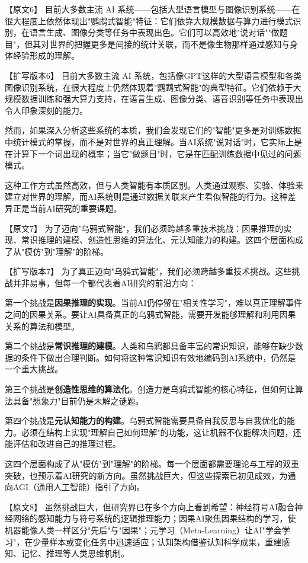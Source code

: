 【原文6】
目前大多数主流 AI 系统——包括大型语言模型与图像识别系统——在很大程度上依然体现出"鹦鹉式智能"特征：它们依靠大规模数据与算力进行模式识别，在语言生成、图像分类等任务中表现出色。它们可以高效地"说对话""做题目"，但其对世界的把握更多是间接的统计关联，而不是像生物那样通过感知与身体经验形成的理解。

【扩写版本6】
目前大多数主流 AI 系统，包括像GPT这样的大型语言模型和各类图像识别系统，在很大程度上仍然体现着"鹦鹉式智能"的典型特征。它们依赖于大规模数据训练和强大算力支持，在语言生成、图像分类、语音识别等任务中表现出令人印象深刻的能力。

然而，如果深入分析这些系统的本质，我们会发现它们的"智能"更多是对训练数据中统计模式的掌握，而不是对世界的真正理解。当AI系统"说对话"时，它实际上是在计算下一个词出现的概率；当它"做题目"时，它是在匹配训练数据中见过的问题模式。

这种工作方式虽然高效，但与人类智能有本质区别。人类通过观察、实验、体验来建立对世界的理解，而AI系统则是通过数据关联来产生看似智能的行为。这种差异正是当前AI研究的重要课题。

【原文7】
为了迈向"乌鸦式智能"，我们必须跨越多重技术挑战：因果推理的实现、常识推理的建模、创造性思维的算法化、元认知能力的构建。这四个层面构成了从"模仿"到"理解"的阶梯。

【扩写版本7】
为了真正迈向"乌鸦式智能"，我们必须跨越多重技术挑战。这些挑战并非易事，但每一个都代表着AI研究的前沿方向：

第一个挑战是\textbf{因果推理的实现}。当前AI仍停留在"相关性学习"，难以真正理解事件之间的因果关系。要让AI具备真正的乌鸦式智能，需要开发能够理解和利用因果关系的算法和模型。

第二个挑战是\textbf{常识推理的建模}。人类和乌鸦都具备丰富的常识知识，能够在缺少数据的条件下做出合理判断。如何将这种常识知识有效地编码到AI系统中，仍然是一个重大挑战。

第三个挑战是\textbf{创造性思维的算法化}。创造力是乌鸦式智能的核心特征，但如何让算法具备"想象力"目前仍是未解之谜题。

第四个挑战是\textbf{元认知能力的构建}。乌鸦式智能需要具备自我反思与自我优化的能力。必须在结构上实现"理解自己如何理解"的功能，这让机器不仅能解决问题，还能评估和改进自己的推理过程。

这四个层面构成了从"模仿"到"理解"的阶梯。每一个层面都需要理论与工程的双重突破，也预示着AI研究的新方向。虽然挑战巨大，但这些探索已初见成效，为通向AGI（通用人工智能）指引了方向。

【原文8】
虽然挑战巨大，但研究界已在多个方向上看到希望：神经符号AI融合神经网络的感知能力与符号系统的逻辑推理能力；因果AI聚焦因果结构的学习，使机器能像人类一样区分"先后"与"因果"；元学习（Meta-Learning）让AI"学会学习"，在少量样本或变化任务中迅速适应；认知架构借鉴认知科学成果，重建感知、记忆、推理等人类思维机制。

